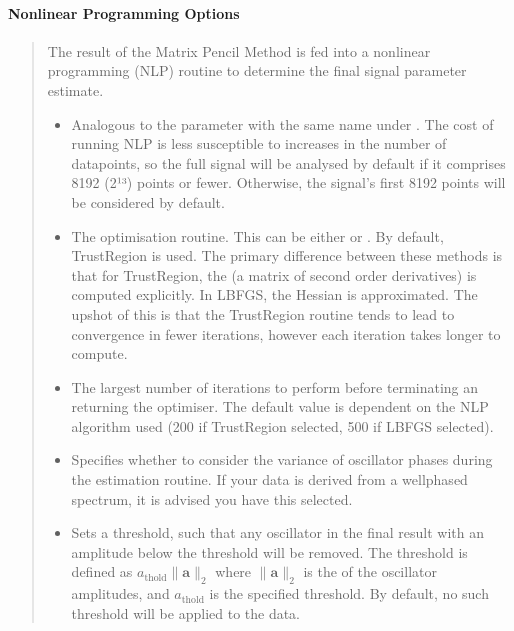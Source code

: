 \documentclass[letterpaper,10pt,english]{sphinxmanual}
\begin{document}
\paragraph{Nonlinear Programming Options}
\label{\detokenize{gui/usage/setup:nonlinear-programming-options}}\begin{quote}

\sphinxAtStartPar
The result of the Matrix Pencil Method is fed into a nonlinear programming
(NLP) routine to determine the final signal parameter estimate.
\begin{itemize}
\item {} 
\sphinxAtStartPar
{} \sphinxhyphen{} Analogous to the parameter with the same name
under . The cost of running NLP is less susceptible to
increases in the number of datapoints, so the full signal will be analysed
by default if it comprises 8192 (2¹³) points or fewer. Otherwise, the
signal’s first 8192 points will be considered by default.

\item {} 
\sphinxAtStartPar
{} \sphinxhyphen{} The optimisation routine. This can be either
 or . By default, Trust\sphinxhyphen{}Region is used. The primary
difference between these methods is that for Trust\sphinxhyphen{}Region, the
 (a matrix
of second order derivatives) is computed
explicitly. In L\sphinxhyphen{}BFGS, the Hessian is approximated. The upshot of this
is that the Trust\sphinxhyphen{}Region routine tends to lead to convergence in fewer
iterations, however each iteration takes longer to compute.

\item {} 
\sphinxAtStartPar
{} \sphinxhyphen{} The largest number of iterations to perform before
terminating an returning the optimiser. The default value is dependent on
the NLP algorithm used (200 if Trust\sphinxhyphen{}Region selected, 500 if L\sphinxhyphen{}BFGS
selected).

\item {} 
\sphinxAtStartPar
{} \sphinxhyphen{} Specifies whether to consider the variance of
oscillator phases during the estimation routine. If your data is derived
from a well\sphinxhyphen{}phased spectrum, it is advised you have this selected.

\item {} 
\sphinxAtStartPar
{} \sphinxhyphen{} Sets a threshold, such that any oscillator in the
final result with an amplitude below the threshold will be removed. The
threshold is defined as
\(a_{\mathrm{thold}} \lVert\boldsymbol{a}\rVert_2\) where
\(\lVert\boldsymbol{a}\rVert_2\) is the
 of
the oscillator amplitudes, and \(a_{\mathrm{thold}}\) is the specified
threshold. By default, no such threshold will be applied to the data.

\end{itemize}
\end{quote}
\end{document}
